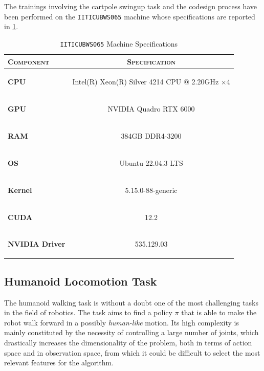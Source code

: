 The trainings involving the cartpole swingup task and the codesign process have been performed on the \texttt{IITICUBWS065} machine whose specifications are reported in \cref{tab:rl_machine}.

\begin{table}[h]
    \centering
    \caption{\texttt{IITICUBWS065} Machine Specifications}
    \label{tab:rl_machine}
    \begin{tabular}[h]{l c}
        \toprule
        \textsc{Component}     & \textsc{Specification}                                                        \\
        \midrule
        \textbf{CPU}           & \begin{small}Intel(R) Xeon(R) Silver 4214 CPU @ 2.20GHz $\times 4$\end{small} \\
        \textbf{GPU}           & \begin{small}NVIDIA Quadro RTX 6000             \end{small}                   \\
        \textbf{RAM}           & \begin{small}384GB DDR4-3200                         \end{small}              \\
        \textbf{OS}            & \begin{small}Ubuntu 22.04.3 LTS                       \end{small}             \\
        \textbf{Kernel}        & \begin{small}5.15.0-88-generic        \end{small}                             \\
        \textbf{CUDA}          & \begin{small}12.2                                  \end{small}                \\
        \textbf{NVIDIA Driver} & \begin{small}535.129.03                             \end{small}               \\
        \bottomrule
    \end{tabular}
\end{table}

\subsection{Humanoid Locomotion Task}
The humanoid walking task is without a doubt one of the most challenging tasks in the field of robotics. The task aims to find a policy $\pi$ that is able to make the robot walk forward in a possibly \textit{human-like} motion. Its high complexity is mainly constituted by the necessity of controlling a large number of joints, which drastically increases the dimensionality of the problem, both in terms of action space and in observation space, from which it could be difficult to select the most relevant features for the algorithm.

